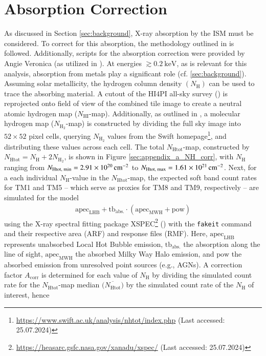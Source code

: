 \section{Absorption Correction}
As discussed in Section \ref{sec:background}, X-ray absorption by the ISM must be considered. To correct for this absorption, the methodology outlined in \citep{Reiprich2021} is followed. Additionally, scripts for the absorption correction were provided by Angie Veronica (as utilized in \cite{veronica2020}). At energies \(\gtrsim \SI{0.2}{\kilo\electronvolt}\), as is relevant for this analysis, absorption from metals play a significant role (cf. \ref{sec:background}). 
Assuming solar metallicity, the hydrogen column density \({\textstyle (N_\text{H})}\) can be used to trace the absorbing material. A cutout of the HI4PI all-sky survey (\cite{HI4PI2016}) is reprojected onto field of view of the combined tile image to create a neutral atomic hydrogen map (\({\textstyle N_{\text{HI}}}\)-map). Additionally, as outlined in \citep{Willingale2013}, a molecular hydrogen map (\({\textstyle N_{\text{H}_2}}\)-map) is constructed by dividing the full sky image into \(52 \times 52\) pixel cells, querying \({\textstyle N_{\text{H}_2}}\) values from the Swift homepage\footnote{\url{https://www.swift.ac.uk/analysis/nhtot/index.php} (Last accessed: 25.07.2024)}, and distributing these values across each cell. The total \({\textstyle N_{\text{Htot}}}\)-map, constructed by \({\textstyle N_{\text{Htot}} = N_{\text{H}} + 2N_{\text{H}_2}}\), is shown in Figure \ref{sec:appendix_a_NH_corr}, with \({\textstyle N_{\text{H}}}\) ranging from \({\textstyle N_\text{Htot, min} = \SI{2.91e+20}{{\centi\meter}^{-2}}}\) to \({\textstyle N_\text{Htot, max} = \SI{1.61e+21}{{\centi\meter}^{-2}}}\).
Next, for a each individual \({\textstyle N_{\text{H}}}\)-value in the \({\textstyle N_{\text{Htot}}}\)-map, the expected soft band count rates for TM1 and TM5 -- which serve as proxies for TM8 and TM9, respectively -- are simulated for the model
\begin{align*}
    \text{apec}_{\text{LHB}} + \text{tb}_\text{abs.}\cdot(\text{apec}_{\text{MWH}} + \text{pow})
\end{align*}
using the X-ray spectral fitting package XSPEC\footnote{\url{https://heasarc.gsfc.nasa.gov/xanadu/xspec/} (Last accessed: 25.07.2024)} (\cite{Arnaud1996}) with the \texttt{fakeit} command and their respective area (ARF) and response files (RMF). Here, \(\text{apec}_{\text{LHB}}\) represents unabsorbed Local Hot Bubble emission, \(\text{tb}_\text{abs.}\) the absorption along the line of sight, \(\text{apec}_{\text{MWH}}\) the absorbed Milky Way Halo emission, and \(\text{pow}\) the absorbed emission from unresolved point sources (e.g., AGNs). A correction factor \(A_{\text{corr}}\) is determined for each value of \(N_\text{H}\) by dividing the simulated count rate for the \({\textstyle N_{\text{Htot}}}\)-map median \({\textstyle \bigl(\overline{N_{\text{Htot}}}\bigr)}\) by the simulated count rate of the \({\textstyle N_{\text{H}}}\) of interest, hence
